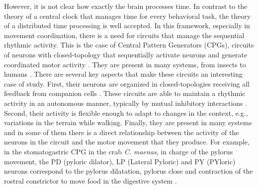 However, it is not clear how exactly the brain processes time. In contrast to the theory of a central clock that manages time for every behavioral task, the theory of a distributed time processing \parencite{buonomano_temporal_1995,ivry_representation_1996} is well accepted. In this framework, especially in movement coordination, there is a need for circuits that manage the sequential rhythmic activity. This is the case of Central Pattern Generators (CPGs), circuits of neurons with closed-topology that sequentially activate neurons and generate coordinated motor activity \parencite{selverston_reliable_2000}. They are present in many systems, from insects to humans \parencite{pearson_central_1972,marder_central_2001,mackay-lyons_central_2002,minassian_human_2017}. There are several key aspects that make these circuits an interesting case of study. First, their neurons are organized in closed-topologies receiving all feedback from companion cells \parencite{huerta_topology_2001}. These circuits are able to maintain a rhythmic activity in an autonomous manner, typically by mutual inhibitory interactions \parencite{katz_evolution_nodate}. Second, their activity is flexible enough to adapt to changes in the context, e.g., variations in the terrain while walking. Finally, they are present in many systems and in some of them there is a direct relationship between the activity of the neurons in the circuit and the motor movement that they produce. For example, in the stomatogastric CPG in the crab \textit{C. maenas}, in charge of the pylorus movement, the PD (pyloric dilator), LP (Lateral Pyloric) and PY (PYloric) neurons correspond to the pylorus dilatation, pylorus close and contraction of the rostral constrictor to move food in the digestive system \parencite{moulins_introduction_1987,selverston_oscillations_2006}.

